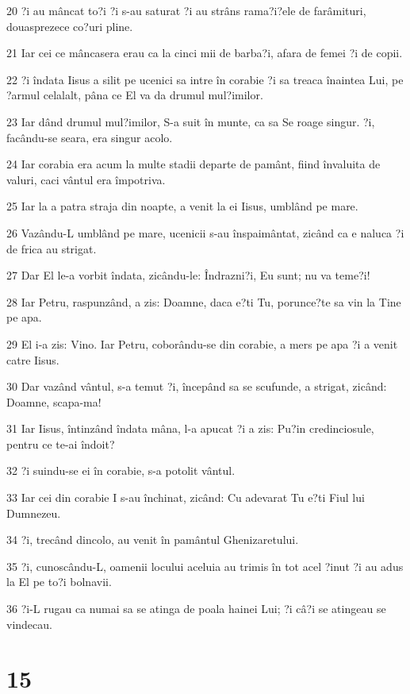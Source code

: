 \par 20 ?i au mâncat to?i ?i s-au saturat ?i au strâns rama?i?ele de farâmituri, douasprezece co?uri pline.
\par 21 Iar cei ce mâncasera erau ca la cinci mii de barba?i, afara de femei ?i de copii.
\par 22 ?i îndata Iisus a silit pe ucenici sa intre în corabie ?i sa treaca înaintea Lui, pe ?armul celalalt, pâna ce El va da drumul mul?imilor.
\par 23 Iar dând drumul mul?imilor, S-a suit în munte, ca sa Se roage singur. ?i, facându-se seara, era singur acolo.
\par 24 Iar corabia era acum la multe stadii departe de pamânt, fiind învaluita de valuri, caci vântul era împotriva.
\par 25 Iar la a patra straja din noapte, a venit la ei Iisus, umblând pe mare.
\par 26 Vazându-L umblând pe mare, ucenicii s-au înspaimântat, zicând ca e naluca ?i de frica au strigat.
\par 27 Dar El le-a vorbit îndata, zicându-le: Îndrazni?i, Eu sunt; nu va teme?i!
\par 28 Iar Petru, raspunzând, a zis: Doamne, daca e?ti Tu, porunce?te sa vin la Tine pe apa.
\par 29 El i-a zis: Vino. Iar Petru, coborându-se din corabie, a mers pe apa ?i a venit catre Iisus.
\par 30 Dar vazând vântul, s-a temut ?i, începând sa se scufunde, a strigat, zicând: Doamne, scapa-ma!
\par 31 Iar Iisus, întinzând îndata mâna, l-a apucat ?i a zis: Pu?in credinciosule, pentru ce te-ai îndoit?
\par 32 ?i suindu-se ei în corabie, s-a potolit vântul.
\par 33 Iar cei din corabie I s-au închinat, zicând: Cu adevarat Tu e?ti Fiul lui Dumnezeu.
\par 34 ?i, trecând dincolo, au venit în pamântul Ghenizaretului.
\par 35 ?i, cunoscându-L, oamenii locului aceluia au trimis în tot acel ?inut ?i au adus la El pe to?i bolnavii.
\par 36 ?i-L rugau ca numai sa se atinga de poala hainei Lui; ?i câ?i se atingeau se vindecau.

\chapter{15}

